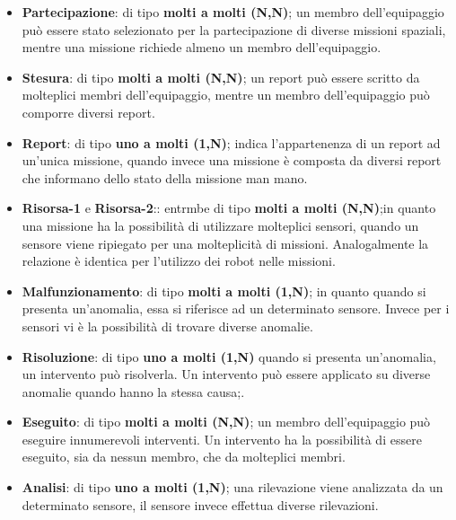 \begin{itemize}
\item \textbf{Partecipazione}: di tipo \textbf{molti a molti (N,N)}; un membro dell'equipaggio può essere stato selezionato per la partecipazione di diverse missioni spaziali, mentre una missione richiede almeno un membro dell'equipaggio.
\item \textbf{Stesura}: di tipo \textbf{molti a molti (N,N)}; un report può essere scritto da molteplici membri dell'equipaggio, mentre un membro dell'equipaggio può comporre diversi report.
\item \textbf{Report}: di tipo \textbf{uno a molti (1,N)}; indica l'appartenenza di un report ad un'unica missione, quando invece una missione è composta da diversi report che informano dello stato della missione man mano.
\item \textbf{Risorsa-1} e \textbf{Risorsa-2}:: entrmbe di tipo \textbf{molti a molti (N,N)};in quanto una missione ha la possibilità di utilizzare molteplici sensori, quando un sensore viene ripiegato per una molteplicità di missioni. Analogalmente la relazione è identica per l'utilizzo dei robot nelle missioni.
\item \textbf{Malfunzionamento}: di tipo \textbf{molti a molti (1,N)}; in quanto quando si presenta un'anomalia, essa si riferisce ad un determinato sensore. Invece per i sensori vi è la possibilità di trovare diverse anomalie.
\item \textbf{Risoluzione}: di tipo \textbf{uno a molti (1,N)} quando si presenta un'anomalia, un intervento può risolverla. Un intervento può essere applicato su diverse anomalie quando hanno la stessa causa;.
\item \textbf{Eseguito}: di tipo \textbf{molti a molti (N,N)}; un membro dell'equipaggio può eseguire innumerevoli interventi. Un intervento ha la possibilità di essere eseguito, sia da nessun membro, che da molteplici membri.
\item \textbf{Analisi}: di tipo \textbf{uno a molti (1,N)}; una rilevazione viene analizzata da un determinato sensore, il sensore invece effettua diverse rilevazioni.
\end{itemize}